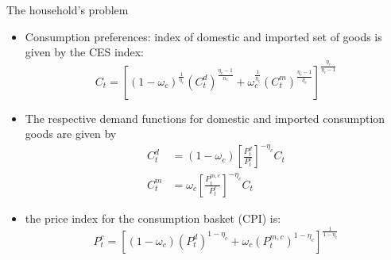 \documentclass[9pt]{beamer}
\begin{document}
\begin{frame}{The household’s problem}
\label{frame4}
\begin{itemize}

    \item  Consumption preferences: index of domestic and imported set of goods is given by the CES index: $$C_{t}=\left[\left(1-\omega_{c}\right)^{\frac{1}{\eta_{c}}}\left(C_{t}^{d}\right)^{\frac{\eta_{c}-1}{n_{c}}}+\omega_{c}^{\frac{1}{\eta_{c}}}\left(C_{t}^{m}\right)^{\frac{\eta_{c}-1}{\eta_{c}}}\right]^{\frac{\eta_{c}}{\eta_{c}-1}}$$
    
    \item The respective demand functions for domestic and imported
    consumption goods are given by
    $$
    \begin{aligned}
    C_{t}^{d} &=\left(1-\omega_{c}\right)\left[\frac{P_{t}^{d}}{P_{t}^{c}}\right]^{-\eta_{c}} C_{t} \\
    C_{t}^{m} &=\omega_{c}\left[\frac{P_{t}^{m, c}}{P_{t}^{c}}\right]^{-\eta_{c}} C_{t}
    \end{aligned}
    $$
    
        
    \item the price index for the consumption basket (CPI) is:
    $$P_{t}^{c}=\left[\left(1-\omega_{c}\right)\left(P_{t}^{d}\right)^{1-\eta_{c}}+\omega_{c}\left(P_{t}^{m, c}\right)^{1-\eta_{c}}\right]^{\frac{1}{1-\eta_{c}}}$$
        
        
\end{itemize}

\hyperlink{DomUnit4}{}


\end{frame}
\end{document}
